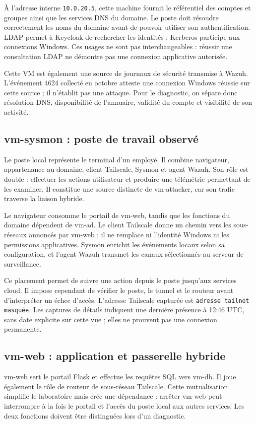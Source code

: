 \documentclass[a4paper,12pt]{report}
\begin{document}
À l'adresse interne \texttt{10.0.20.5}, cette machine fournit le référentiel des comptes et groupes ainsi que les services DNS du domaine. Le poste doit résoudre correctement les noms du domaine avant de pouvoir utiliser son authentification. LDAP permet à Keycloak de rechercher les identités ; Kerberos participe aux connexions Windows. Ces usages ne sont pas interchangeables : réussir une consultation LDAP ne démontre pas une connexion applicative autorisée.

Cette VM est également une source de journaux de sécurité transmise à Wazuh. L'événement 4624 collecté en octobre atteste une connexion Windows réussie sur cette source ; il n'établit pas une attaque. Pour le diagnostic, on sépare donc résolution DNS, disponibilité de l'annuaire, validité du compte et visibilité de son activité.

\subsection{vm-sysmon : poste de travail observé}
Le poste local représente le terminal d'un employé. Il combine navigateur, appartenance au domaine, client Tailscale, Sysmon et agent Wazuh. Son rôle est double : effectuer les actions utilisateur et produire une télémétrie permettant de les examiner. Il constitue une source distincte de vm-attacker, car son trafic traverse la liaison hybride.

Le navigateur consomme le portail de vm-web, tandis que les fonctions du domaine dépendent de vm-ad. Le client Tailscale donne un chemin vers les sous-réseaux annoncés par vm-web ; il ne remplace ni l'identité Windows ni les permissions applicatives. Sysmon enrichit les événements locaux selon sa configuration, et l'agent Wazuh transmet les canaux sélectionnés au serveur de surveillance.

Ce placement permet de suivre une action depuis le poste jusqu'aux services cloud. Il impose cependant de vérifier le poste, le tunnel et le routeur avant d'interpréter un échec d'accès. L'adresse Tailscale capturée est \texttt{adresse tailnet masquée}. Les captures de détails indiquent une dernière présence à 12:46 UTC, sans date explicite sur cette vue ; elles ne prouvent pas une connexion permanente.

\subsection{vm-web : application et passerelle hybride}
vm-web sert le portail Flask et effectue les requêtes SQL vers vm-db. Il joue également le rôle de routeur de sous-réseau Tailscale. Cette mutualisation simplifie le laboratoire mais crée une dépendance : arrêter vm-web peut interrompre à la fois le portail et l'accès du poste local aux autres services. Les deux fonctions doivent être distinguées lors d'un diagnostic.
\end{document}
